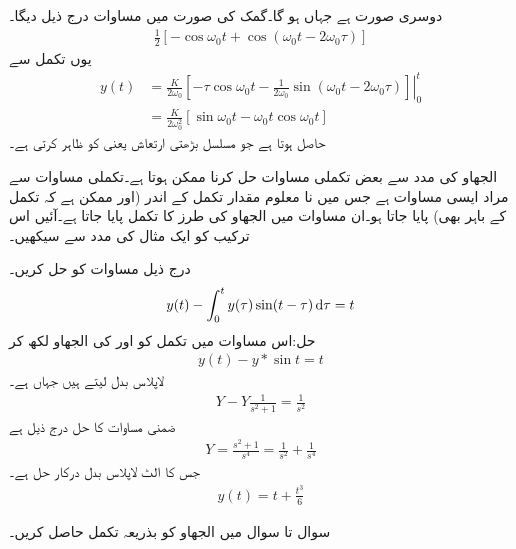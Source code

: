  دوسری صورت ہے جہاں  ہو گا۔گمک کی صورت میں مساوات  درج ذیل دیگا۔
\begin{align*}
\frac{1}{2}[-\cos \omega_0 t+\cos(\omega_0 t-2\omega_0 \tau)]
\end{align*}
یوں تکمل سے
\begin{align*}
y(t)&=\left. \frac{K}{2\omega_0}[-\tau \cos \omega_0 t-\frac{1}{2\omega_0} \sin(\omega_0 t-2\omega_0 \tau)] \right|_{0}^{t}\\
&=\frac{K}{2\omega_0^2}[\sin \omega_0 t-\omega_0 t \cos \omega_0 t]
\end{align*}
حاصل ہوتا ہے جو مسلسل بڑھتی ارتعاش یعنی  کو ظاہر کرتی ہے۔

الجھاو کی مدد سے بعض تکملی مساوات حل کرنا ممکن ہوتا ہے۔تکملی مساوات سے مراد ایسی مساوات ہے جس میں نا معلوم  مقدار  تکمل کے اندر (اور ممکن ہے کہ تکمل کے باہر بھی) پایا جاتا ہو۔ان مساوات میں الجھاو کی طرز کا تکمل پایا جاتا ہے۔آئیں اس ترکیب کو ایک مثال کی مدد سے سیکھیں۔

درج ذیل مساوات کو حل کریں۔
\begin{align*}
y(t)-\int_{0}^{t}y(\tau)\sin(t-\tau)\dif \tau=t
\end{align*}
حل:اس مساوات میں تکمل کو  اور  کی الجھاو  لکھ کر
\begin{align*}
y(t)-y*\sin t=t
\end{align*}
لاپلاس بدل لیتے ہیں جہاں  ہے۔
\begin{align*}
Y-Y\frac{1}{s^2+1}=\frac{1}{s^2}
\end{align*}
ضمنی مساوات کا حل درج ذیل ہے
\begin{align*}
Y=\frac{s^2+1}{s^4}=\frac{1}{s^2}+\frac{1}{s^4}
\end{align*}
جس کا الٹ لاپلاس بدل درکار حل ہے۔
\begin{align*}
y(t)=t+\frac{t^3}{6}
\end{align*}

سوال  تا سوال  میں الجھاو کو  بذریعہ تکمل حاصل کریں۔

